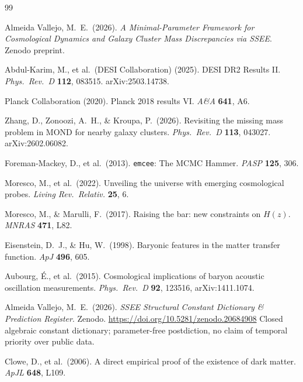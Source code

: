 \documentclass[12pt,a4paper]{article}
\begin{document}
\clearpage

\begin{thebibliography}{99}

Almeida Vallejo, M.~E.\ (2026).
\textit{A Minimal-Parameter Framework for Cosmological Dynamics and
Galaxy Cluster Mass Discrepancies via SSEE}. Zenodo preprint.

Abdul-Karim, M., et al.\ (DESI Collaboration) (2025).
DESI DR2 Results II.
\textit{Phys.\ Rev.\ D} \textbf{112}, 083515. arXiv:2503.14738.

Planck Collaboration (2020).
Planck 2018 results VI.
\textit{A\&A} \textbf{641}, A6.

Zhang, D., Zonoozi, A.~H., \& Kroupa, P.\ (2026).
Revisiting the missing mass problem in MOND for nearby galaxy clusters.
\textit{Phys.\ Rev.\ D} \textbf{113}, 043027. arXiv:2602.06082.

Foreman-Mackey, D., et al.\ (2013).
\texttt{emcee}: The MCMC Hammer.
\textit{PASP} \textbf{125}, 306.

Moresco, M., et al.\ (2022).
Unveiling the universe with emerging cosmological probes.
\textit{Living Rev.\ Relativ.} \textbf{25}, 6.

Moresco, M., \& Marulli, F.\ (2017).
Raising the bar: new constraints on $H(z)$.
\textit{MNRAS} \textbf{471}, L82.

Eisenstein, D.~J., \& Hu, W.\ (1998).
Baryonic features in the matter transfer function.
\textit{ApJ} \textbf{496}, 605.

Aubourg, \'E., et al.\ (2015).
Cosmological implications of baryon acoustic oscillation measurements.
\textit{Phys.\ Rev.\ D} \textbf{92}, 123516, arXiv:1411.1074.

Almeida Vallejo, M.~E.\ (2026).
\textit{SSEE Structural Constant Dictionary \& Prediction Register}.
Zenodo. \url{https://doi.org/10.5281/zenodo.20684908}
Closed algebraic constant dictionary; parameter-free postdiction, no claim of
temporal priority over public data.

Clowe, D., et al.\ (2006).
A direct empirical proof of the existence of dark matter.
\textit{ApJL} \textbf{648}, L109.


\end{thebibliography}
\end{document}
